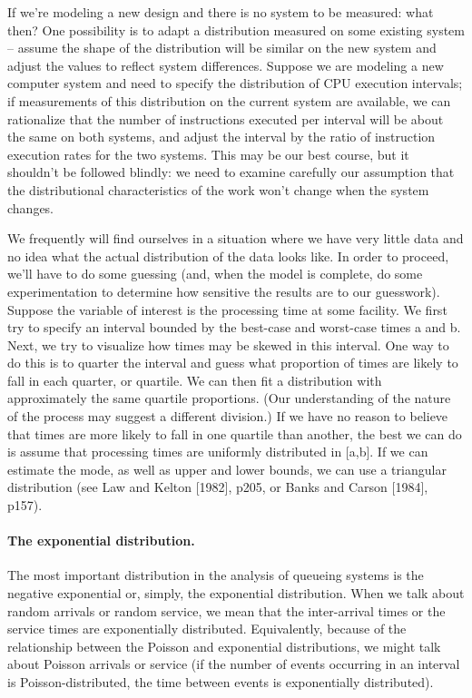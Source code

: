 If we're modeling a new design and there is no system to be measured:
what then? One possibility is to adapt a distribution measured on some existing
system -- assume the shape of the distribution will be similar on the new
system and adjust the values to reflect system differences. Suppose we are
modeling a new computer system and need to specify the distribution of CPU
execution intervals; if measurements of this distribution on the current system
are available, we can rationalize that the number of instructions executed per
interval will be about the same on both systems, and adjust the interval by the
ratio of instruction execution rates for the two systems. This may be our best
course, but it shouldn't be followed blindly: we need to examine carefully our
assumption that the distributional characteristics of the work won't change
when the system changes.

We frequently will find ourselves in a situation where we have very little data
and no idea what the actual distribution of the data looks like. In order to
proceed, we'll have to do some guessing (and, when the model is complete, do
some experimentation to determine how sensitive the results are to our
guesswork). Suppose the variable of interest is the processing time at some
facility. We first try to specify an interval bounded by the best-case and
worst-case times a and b. Next, we try to visualize how times may be skewed in
this interval. One way to do this is to quarter the interval and guess what
proportion of times are likely to fall in each quarter, or quartile. We can
then fit a distribution with approximately the same quartile proportions. (Our
understanding of the nature of the process may suggest a different division.)
If we have no reason to believe that times are more likely to fall in one
quartile than another, the best we can do is assume that processing times are
uniformly distributed in [a,b]. If we can estimate the mode, as well as upper
and lower bounds, we can use a triangular distribution (see Law and Kelton
[1982], p205, or Banks and Carson [1984], p157).

\paragraph{The exponential distribution.}
The most important distribution in the analysis of queueing systems is the
negative exponential or, simply, the exponential distribution. When we talk
about random arrivals or random service, we mean that the inter-arrival times
or the service times are exponentially distributed. Equivalently, because of
the relationship between the Poisson and exponential distributions, we might
talk about Poisson arrivals or service (if the number of events occurring in an
interval is Poisson-distributed, the time between events is exponentially
distributed).

